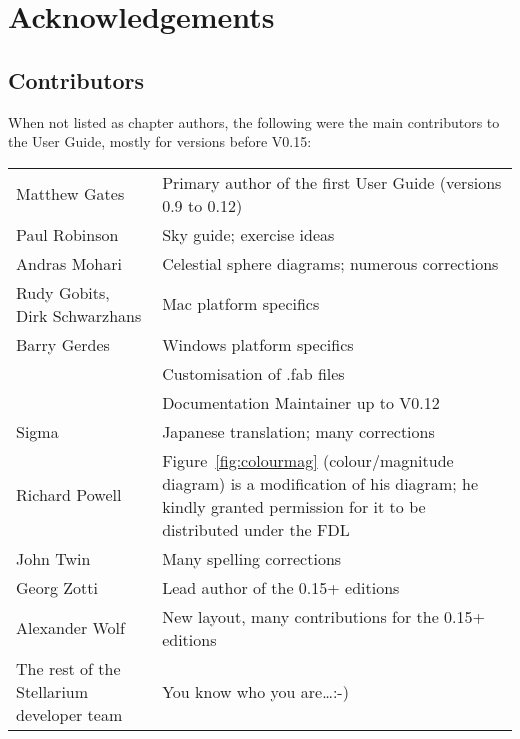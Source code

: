 \chapter{Acknowledgements}

\section{Contributors}
\label{sec:Contributors}
When not listed as chapter authors, the following were the main contributors to the User Guide, mostly for versions before V0.15:

\noindent%
\begin{tabularx}{\textwidth}{l|X}
\toprule
Matthew Gates  & Primary author of the first User Guide (versions 0.9 to 0.12)\\
Paul Robinson  &Sky guide; exercise ideas\\
Andras Mohari  &Celestial sphere diagrams; numerous corrections\\
Rudy Gobits, Dirk Schwarzhans & Mac platform specifics\\
Barry Gerdes   &Windows platform specifics \\
               &Customisation of .fab files\\
               &Documentation Maintainer up to V0.12\\
Sigma          &Japanese translation; many corrections\\ %
Richard Powell & Figure~\ref{fig:colourmag} (colour/magnitude diagram) is a modification of his diagram; 
                 he kindly granted permission for it to be distributed under the FDL\\
John Twin      & Many spelling corrections \\
Georg Zotti    & Lead author of the 0.15+ editions\\
Alexander Wolf & New layout, many contributions for the 0.15+ editions\\
The rest of the Stellarium developer team & You know who you are\ldots :-)\tabularnewline
\bottomrule
\end{tabularx}


